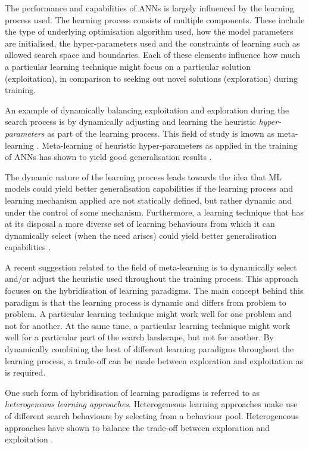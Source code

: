 The performance and capabilities of \acp{ANN} is largely influenced by the learning process used. The learning process consists of multiple components. These include the type of underlying optimisation algorithm used, how the model parameters are initialised, the hyper-parameters used and the constraints of learning such as allowed search space and boundaries. Each of these elements influence how much a particular learning technique might focus on a particular solution (exploitation), in comparison to seeking out novel solutions (exploration) during training.

An example of dynamically balancing exploitation and exploration during the search process is by dynamically adjusting and learning the heuristic \textit{hyper-parameters} as part of the learning process. This field of study is known as meta-learning \cite{ref:giraud:2004}. Meta-learning of heuristic hyper-parameters as applied in the training of \acp{ANN} has shown to yield good generalisation results \cite{ref:hospedales:2020, ref:vilalta:2002}.

The dynamic nature of the learning process leads towards the idea that \ac{ML} models could yield better generalisation capabilities if the learning process and learning mechanism applied are not statically defined, but rather dynamic and under the control of some mechanism. Furthermore, a learning technique that has at its disposal a more diverse set of learning behaviours from which it can dynamically select (when the need arises) could yield better generalisation capabilities \cite{ref:huang:2009}.

A recent suggestion related to the field of meta-learning is to dynamically select and/or adjust the heuristic used throughout the training process. This approach focuses on the hybridisation of learning paradigms. The main concept behind this paradigm is that the learning process is dynamic and differs from problem to problem. A particular learning technique might work well for one problem and not for another. At the same time, a particular learning technique might work well for a particular part of the search landscape, but not for another. By dynamically combining the best of different learning paradigms throughout the learning process, a trade-off can be made between exploration and exploitation as is required.

One such form of hybridisation of learning paradigms is referred to as \textit{heterogeneous learning approaches}. Heterogeneous learning approaches make use of different search behaviours by selecting from a behaviour pool. Heterogeneous approaches have shown to balance the trade-off between exploration and exploitation \cite{ref:nepomuceno:2013}.

